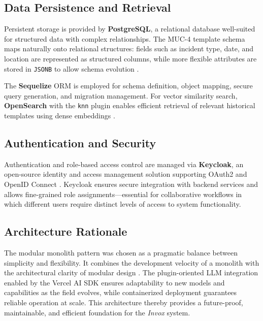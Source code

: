 \subsection*{Data Persistence and Retrieval}

Persistent storage is provided by \textbf{PostgreSQL}, a relational database well-suited for structured data with complex relationships. The MUC-4 template schema maps naturally onto relational structures: fields such as incident type, date, and location are represented as structured columns, while more flexible attributes are stored in \texttt{JSONB} to allow schema evolution \cite{postgresql_jsonb}.

The \textbf{Sequelize} ORM is employed for schema definition, object mapping, secure query generation, and migration management. For vector similarity search, \textbf{OpenSearch} with the \texttt{knn} plugin enables efficient retrieval of relevant historical templates using dense embeddings \cite{opensearch_knn}.

\subsection*{Authentication and Security}

Authentication and role-based access control are managed via \textbf{Keycloak}, an open-source identity and access management solution supporting OAuth2 and OpenID Connect \cite{rfc6749,openid_connect}. Keycloak ensures secure integration with backend services and allows fine-grained role assignments—essential for collaborative workflows in which different users require distinct levels of access to system functionality.

\subsection*{Architecture Rationale}

The modular monolith pattern was chosen as a pragmatic balance between simplicity and flexibility. It combines the development velocity of a monolith with the architectural clarity of modular design \cite{fowler2015monolith}. The plugin-oriented LLM integration enabled by the Vercel AI SDK ensures adaptability to new models and capabilities as the field evolves, while containerized deployment guarantees reliable operation at scale. This architecture thereby provides a future-proof, maintainable, and efficient foundation for the \textit{Invox} system.

